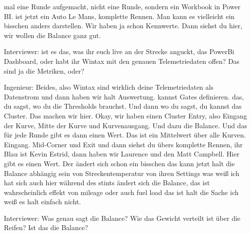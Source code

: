 mal eine Runde aufgemacht, nicht eine Runde, sondern ein Workbook in Power BI. ist jetzt ein Auto Le Mans, komplette Rennen. Man kann es vielleicht ein bisschen anders darstellen. Wir haben ja schon Kennwerte.  Dann siehst du hier, wir wollen die Balance ganz gut.

Interviewer:
ist es das, was ihr euch live an der Strecke anguckt, das PowerBi Dashboard, oder habt ihr Wintax mit den genauen Telemetriedaten offen? Das sind ja die Metriken, oder? 

Ingenieur:
Beides, also Wintax sind wirklich deine Telemetriedaten als Datenstrom und dann haben wir halt Auswertung. kannst Gates definieren. das, du sagst, wo du die Thresholds brauchst. Und dann wo du sagst, du kannst das Cluster. Das machen wir hier. Okay, wir haben einen Cluster Entry, also Eingang der Kurve, Mitte der Kurve und Kurvenausgang. Und dazu die Balance. Und das für jede Runde gibt es dann einen Wert. Das ist ein Mittelwert über alle Kurven. Eingang. Mid-Corner und Exit und dann siehst du übers komplette Rennen, ihr Blau ist Kevin Estrid, dann haben wir Laurence und  den Matt Campbell. Hier gibt es einen Wert. Der ändert sich schon ein bisschen das kann jetzt halt die Balance abhängig sein von Streckentemperatur von ihren Settings was weiß ich hat sich auch hier während des stints ändert sich die Balance, das ist wahrscheinlich effekt von mileage oder auch fuel load das ist halt die Sache ich weiß es halt einfach nicht.


Interviewer:
Was genau sagt die Balance? Wie das Gewicht verteilt ist über die Reifen? Ist das die Balance?

